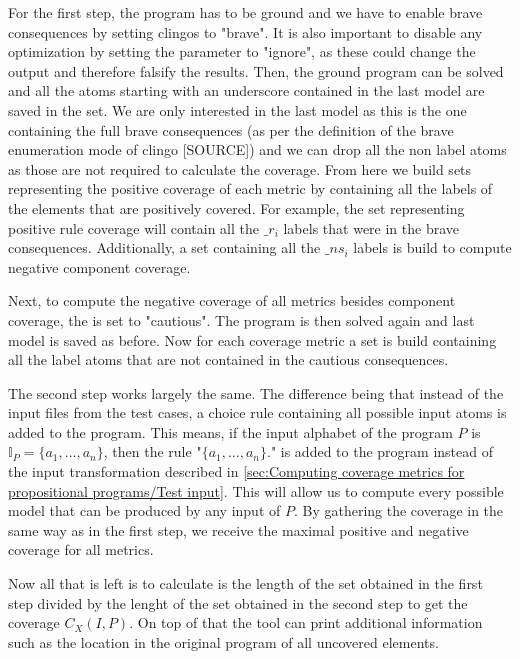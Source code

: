 For the first step, the program has to be ground and we have to enable brave consequences by setting clingos  to "brave". It is also important to disable any optimization by setting the  parameter to "ignore", as these could change the output and therefore falsify the results. Then, the ground program can be solved and all the atoms starting with an underscore contained in the last model are saved in the  set. We are only interested in the last model as this is the one containing the full brave consequences (as per the definition of the brave enumeration mode of clingo [SOURCE]) and we can drop all the non label atoms as those are not required to calculate the coverage. From here we build sets representing the positive coverage of each metric by containing all the labels of the elements that are positively covered. For example, the set representing positive rule coverage will contain all the $\_r_i$ labels that were in the brave consequences. Additionally, a set containing all the $\_ns_i$ labels is build to compute negative component coverage.

Next, to compute the negative coverage of all metrics besides component coverage, the  is set to "cautious". The program is then solved again and last model is saved as before. Now for each coverage metric a set is build containing all the label atoms that are not contained in the cautious consequences.

The second step works largely the same. The difference being that instead of the input files from the test cases, a choice rule containing all possible input atoms is added to the program. This means, if the input alphabet of the program $P$ is \(\mathbb{I}_P = \{a_1, \ldots, a_n\}\), then the rule "\(\{a_1, \ldots, a_n\}.\)" is added to the program instead of the input transformation described in \cref{sec:Computing coverage metrics for propositional programs/Test input}. This will allow us to compute every possible model that can be produced by any input of $P$. By gathering the coverage in the same way as in the first step, we receive the maximal positive and negative coverage for all metrics.

Now all that is left is to calculate is the length of the set obtained in the first step divided by the lenght of the set obtained in the second step to get the coverage \(C_X(I, P)\). On top of that the tool can print additional information such as the location in the original program of all uncovered elements.

